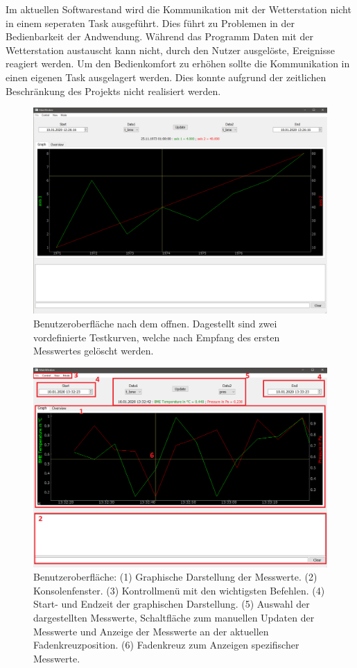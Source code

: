 Im aktuellen Softwarestand wird die Kommunikation mit der Wetterstation nicht in einem seperaten Task ausgeführt. Dies führt zu Problemen in der Bedienbarkeit der Andwendung. Während das Programm Daten mit der Wetterstation austauscht kann nicht, durch den Nutzer ausgelöste, Ereignisse reagiert werden. Um den Bedienkomfort zu erhöhen sollte die Kommunikation in einen eigenen Task ausgelagert werden. Dies konnte aufgrund der zeitlichen Beschränkung des Projekts nicht realisiert werden.
\begin{figure}[H]
  \centering
  \includegraphics[width=\textwidth]{./img/ui_open}
  \caption{Benutzeroberfläche nach dem offnen. Dagestellt sind zwei vordefinierte Testkurven, welche nach Empfang des ersten Messwertes gelöscht werden.}\label{fig:ui_open}
\end{figure}
\begin{figure}[H]
  \centering
  \includegraphics[width=\textwidth]{./img/ui_simulated_graph}
  \caption{Benutzeroberfläche: (1) Graphische Darstellung der Messwerte. (2) Konsolenfenster. (3) Kontrollmenü mit den wichtigsten Befehlen. (4) Start- und Endzeit der graphischen Darstellung. (5) Auswahl der dargestellten Messwerte, Schaltfläche zum manuellen Updaten der Messwerte und Anzeige der Messwerte an der aktuellen Fadenkreuzposition. (6) Fadenkreuz zum Anzeigen spezifischer Messwerte.}\label{fig:ui_graph}
\end{figure}
